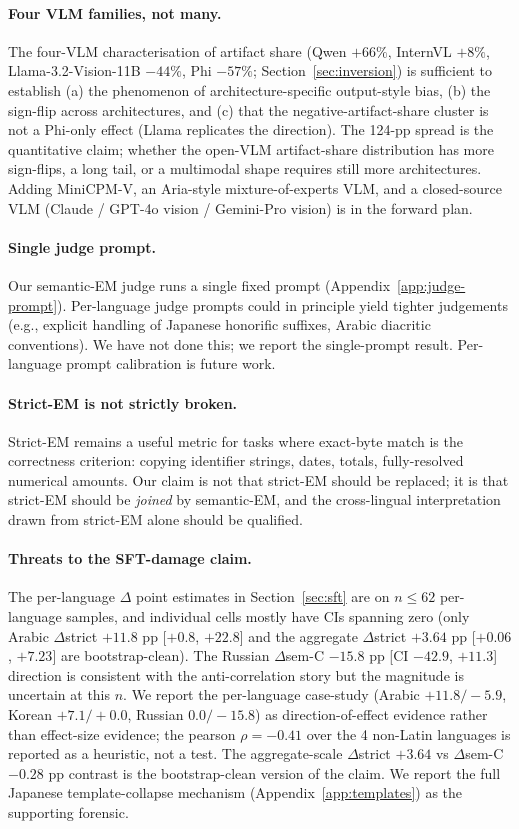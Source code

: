 \paragraph{Four VLM families, not many.}
The four-VLM characterisation of artifact share (Qwen $+66\%$, InternVL $+8\%$, Llama-3.2-Vision-11B $-44\%$, Phi $-57\%$; Section~\ref{sec:inversion}) is sufficient to establish (a) the phenomenon of architecture-specific output-style bias, (b) the sign-flip across architectures, and (c) that the negative-artifact-share cluster is not a Phi-only effect (Llama replicates the direction). The 124-pp spread is the quantitative claim; whether the open-VLM artifact-share distribution has more sign-flips, a long tail, or a multimodal shape requires still more architectures. Adding MiniCPM-V, an Aria-style mixture-of-experts VLM, and a closed-source VLM (Claude / GPT-4o vision / Gemini-Pro vision) is in the forward plan.

\paragraph{Single judge prompt.}
Our semantic-EM judge runs a single fixed prompt (Appendix~\ref{app:judge-prompt}). Per-language judge prompts could in principle yield tighter judgements (e.g., explicit handling of Japanese honorific suffixes, Arabic diacritic conventions). We have not done this; we report the single-prompt result. Per-language prompt calibration is future work.

\paragraph{Strict-EM is not strictly broken.}
Strict-EM remains a useful metric for tasks where exact-byte match is the correctness criterion: copying identifier strings, dates, totals, fully-resolved numerical amounts. Our claim is not that strict-EM should be replaced; it is that strict-EM should be \emph{joined} by semantic-EM, and the cross-lingual interpretation drawn from strict-EM alone should be qualified.

\paragraph{Threats to the SFT-damage claim.}
The per-language $\Delta$ point estimates in Section~\ref{sec:sft} are on $n \leq 62$ per-language samples, and individual cells mostly have CIs spanning zero (only Arabic $\Delta$strict $+11.8$ pp [$+0.8$, $+22.8$] and the aggregate $\Delta$strict $+3.64$ pp [$+0.06$, $+7.23$] are bootstrap-clean). The Russian $\Delta$sem-C $-15.8$ pp [CI $-42.9$, $+11.3$] direction is consistent with the anti-correlation story but the magnitude is uncertain at this $n$. We report the per-language case-study (Arabic $+11.8/-5.9$, Korean $+7.1/+0.0$, Russian $0.0/-15.8$) as direction-of-effect evidence rather than effect-size evidence; the pearson $\rho = -0.41$ over the 4 non-Latin languages is reported as a heuristic, not a test. The aggregate-scale $\Delta$strict $+3.64$ vs $\Delta$sem-C $-0.28$ pp contrast is the bootstrap-clean version of the claim. We report the full Japanese template-collapse mechanism (Appendix~\ref{app:templates}) as the supporting forensic.


